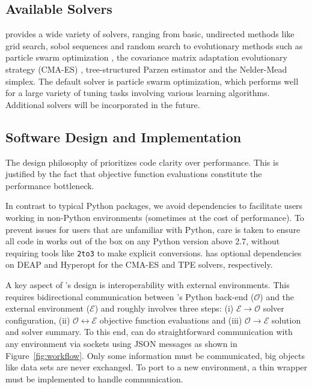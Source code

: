 \subsection{Available Solvers}
\optunity provides a wide variety of solvers, ranging from basic, undirected methods like grid search, sobol sequences and random search \citep{bergstra2012random} to evolutionary methods such as particle swarm optimization \citep{kennedy2010particle}, the covariance matrix adaptation evolutionary strategy (CMA-ES) \citep{hansen2001completely}, tree-structured Parzen estimator \citep{bergstra2011algorithms} and the Nelder-Mead simplex. The default solver is particle swarm optimization, which performs well for a large variety of tuning tasks involving various learning algorithms. Additional solvers will be incorporated in the future.
 
\subsection{Software Design and Implementation}

The design philosophy of \optunity prioritizes code clarity over performance. This is justified by the fact that objective function evaluations constitute the performance bottleneck. 

In contrast to typical Python packages, we avoid dependencies to facilitate users working in non-Python environments (sometimes at the cost of performance). To prevent issues for users that are unfamiliar with Python, care is taken to ensure all code in \optunity works out of the box on any Python version above 2.7, without requiring tools like \texttt{2to3} to make explicit conversions. \optunity has optional dependencies on {\sc DEAP} \citep{fortin2012deap} and {\sc Hyperopt} \citep{bergstra2013hyperopt} for the CMA-ES and TPE solvers, respectively. 

A key aspect of \optunity's design is interoperability with external environments. This requires bidirectional communication between \optunity's Python back-end ($\mathcal{O}$) and the external environment ($\mathcal{E}$) and roughly involves three steps: (i) $\mathcal{E}\rightarrow\mathcal{O}$ solver configuration, (ii) $\mathcal{O}\leftrightarrow\mathcal{E}$ objective function evaluations and (iii) $\mathcal{O}\rightarrow\mathcal{E}$ solution and solver summary. To this end, \optunity can do straightforward communication with any environment via sockets using JSON messages as shown in Figure~\ref{fig:workflow}. Only some information must be communicated, big objects like data sets are never exchanged. To port \optunity to a new environment, a thin wrapper must be implemented to handle communication.

